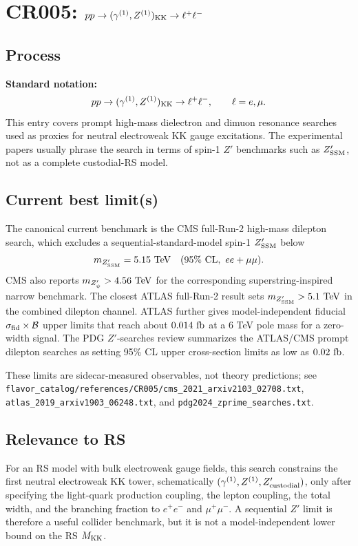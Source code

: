 
\section{CR005: \(pp \to (\gamma^{(1)},Z^{(1)})_{\rm KK}\to \ell^+\ell^-\)}

\subsection*{Process}
\textbf{Standard notation:}
\[
  pp \to (\gamma^{(1)},Z^{(1)})_{\rm KK}\to \ell^+\ell^-,
  \qquad \ell=e,\mu .
\]
This entry covers prompt high-mass dielectron and dimuon resonance searches
used as proxies for neutral electroweak KK gauge excitations.  The
experimental papers usually phrase the search in terms of spin-1 \(Z'\)
benchmarks such as \(Z'_{\rm SSM}\), not as a complete custodial-RS model.

\subsection*{Current best limit(s)}
The canonical current benchmark is the CMS full-Run-2 high-mass dilepton
search, which excludes a sequential-standard-model spin-1 \(Z'_{\rm SSM}\)
below
\[
  m_{Z'_{\rm SSM}} = 5.15~{\rm TeV}
  \quad (95\%~{\rm CL},~ee+\mu\mu).
\]
CMS also reports \(m_{Z'_\psi}>4.56~{\rm TeV}\) for the corresponding
superstring-inspired narrow benchmark.  The closest ATLAS full-Run-2 result
sets \(m_{Z'_{\rm SSM}}>5.1~{\rm TeV}\) in the combined dilepton channel.
ATLAS further gives model-independent fiducial
\(\sigma_{\rm fid}\times{\cal B}\) upper limits that reach about
\(0.014~{\rm fb}\) at a 6 TeV pole mass for a zero-width signal.  The PDG
\(Z'\)-searches review summarizes the ATLAS/CMS prompt dilepton searches as
setting 95\% CL upper cross-section limits as low as \(0.02~{\rm fb}\).

These limits are sidecar-measured observables, not theory predictions; see
\texttt{flavor\_catalog/references/CR005/cms\_2021\_arxiv2103\_02708.txt},
\texttt{atlas\_2019\_arxiv1903\_06248.txt}, and
\texttt{pdg2024\_zprime\_searches.txt}.

\subsection*{Relevance to RS}
For an RS model with bulk electroweak gauge fields, this search constrains
the first neutral electroweak KK tower, schematically
\((\gamma^{(1)},Z^{(1)},Z'_{\rm custodial})\), only after specifying the
light-quark production coupling, the lepton coupling, the total width, and
the branching fraction to \(e^+e^-\) and \(\mu^+\mu^-\).  A sequential
\(Z'\) limit is therefore a useful collider benchmark, but it is not a
model-independent lower bound on the RS \(M_{\rm KK}\).


